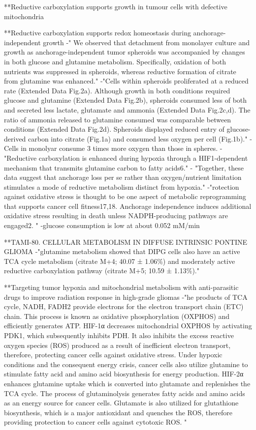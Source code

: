 \documentclass[11pt,a4paper]{article}
\begin{document}
**Reductive carboxylation supports growth in tumour cells with defective mitochondria

**Reductive carboxylation supports redox homeostasis during anchorage-independent growth
-" We observed that detachment from monolayer culture and growth as anchorage-independent tumor spheroids was accompanied by changes in both glucose and glutamine metabolism. Specifically, oxidation of both nutrients was suppressed in spheroids, whereas reductive formation of citrate from glutamine was enhanced."
-"Cells within spheroids proliferated at a reduced rate (Extended Data Fig.2a). Although growth in both conditions required glucose and glutamine (Extended Data Fig.2b), spheroids consumed less of both and secreted less lactate, glutamate and ammonia (Extended Data Fig.2c,d). The ratio of ammonia released to glutamine consumed was comparable between conditions (Extended Data Fig.2d). Spheroids displayed reduced entry of glucose-derived carbon into citrate (Fig.1a) and consumed less oxygen per cell (Fig.1b)."
- Cells in monolyar consume 3 times more oxygen than those in spheres.
- "Reductive carboxylation is enhanced during hypoxia through a HIF1-dependent mechanism that transmits glutamine carbon to fatty acids6." 
- "Together, these data suggest that anchorage loss per se rather than oxygen/nutrient limitation stimulates a mode of reductive metabolism distinct from hypoxia."
-"rotection against oxidative stress is thought to be one aspect of metabolic reprogramming that supports cancer cell fitness17,18. Anchorage independence induces additional oxidative stress resulting in death unless NADPH-producing pathways are engaged2. "
-glucose consumption is low at about 0.052 mM/min


**TAMI-80. CELLULAR METABOLISM IN DIFFUSE INTRINSIC PONTINE GLIOMA
-"glutamine metabolism showed that DIPG cells also have an active TCA cycle metabolism (citrate M+4; 40.07 ± 1.06\%) and moderately active reductive carboxylation pathway (citrate M+5; 10.59 ± 1.13\%)."

**Targeting tumor hypoxia and mitochondrial metabolism with anti-parasitic drugs to improve radiation response in high-grade gliomas
-"he products of TCA cycle, NADH, FADH2 provide electrons for the electron transport chain (ETC) chain. This process is known as oxidative phosphorylation (OXPHOS) and efficiently generates ATP. HIF-1α decreases mitochondrial OXPHOS by activating PDK1, which subsequently inhibits PDH. It also inhibits the excess reactive oxygen species (ROS) produced as a result of inefficient electron transport, therefore, protecting cancer cells against oxidative stress. Under hypoxic conditions and the consequent energy crisis, cancer cells also utilize glutamine to stimulate fatty acid and amino acid biosynthesis for energy production. HIF-2α enhances glutamine uptake which is converted into glutamate and replenishes the TCA cycle. The process of glutaminolysis generates fatty acids and amino acids as an energy source for cancer cells. Glutamate is also utilized for glutathione biosynthesis, which is a major antioxidant and quenches the ROS, therefore providing protection to cancer cells against cytotoxic ROS. "
\end{document}
